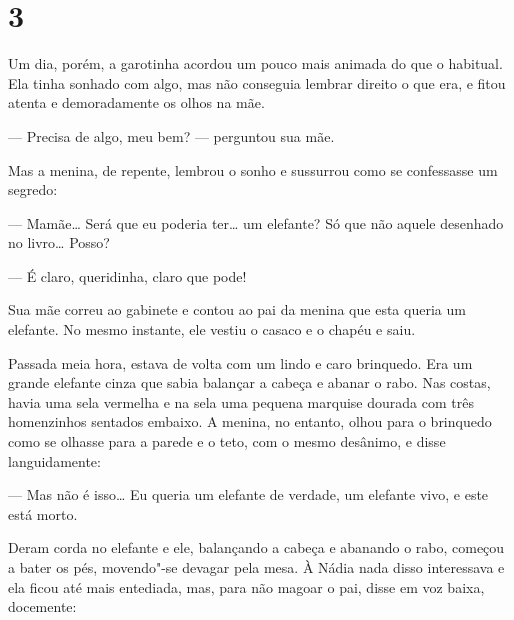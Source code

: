 
\section{3}

Um dia, porém, a garotinha acordou um pouco mais animada do que o
habitual. Ela tinha sonhado com algo, mas não conseguia lembrar direito
o que era, e fitou atenta e demoradamente os olhos na mãe.

--- Precisa de algo, meu bem? --- perguntou sua mãe.

Mas a menina, de repente, lembrou o sonho e sussurrou como se
confessasse um segredo:

--- Mamãe\ldots{} Será que eu poderia ter\ldots{} um elefante? Só que não aquele
desenhado no livro\ldots{} Posso?

--- É claro, queridinha, claro que pode!

Sua mãe correu ao gabinete e contou ao pai da menina que esta queria um
elefante. No mesmo instante, ele vestiu o casaco e o chapéu e saiu.

Passada meia hora, estava de volta com um lindo e caro brinquedo. Era um
grande elefante cinza que sabia balançar a cabeça e abanar o rabo. Nas
costas, havia uma sela vermelha e na sela uma pequena marquise dourada
com três homenzinhos sentados embaixo. A menina, no entanto, olhou para
o brinquedo como se olhasse para a parede e o teto, com o mesmo
desânimo, e disse languidamente:

--- Mas não é isso\ldots{} Eu queria um elefante de verdade, um elefante
vivo, e este está morto.


Deram corda no elefante e ele, balançando a cabeça e abanando o rabo,
começou a bater os pés, movendo"-se devagar pela mesa. À Nádia nada
disso interessava e ela ficou até mais entediada, mas, para não magoar
o pai, disse em voz baixa, docemente:

